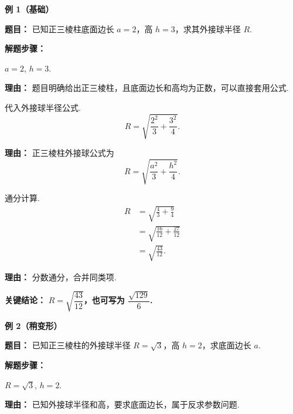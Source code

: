 \begin{examplebox}
	\textbf{\textcolor{CExample}{例 1（基础）}}

	\textbf{\textcolor{CExample}{题目：}} 已知正三棱柱底面边长 $a=2$，高 $h=3$，求其外接球半径 $R$.

	\textbf{\textcolor{CExample}{解题步骤：}}
	\begin{description}[style=nextline, leftmargin=2.8em, labelsep=0.5em, itemsep=0.45em]
		\item[\textbf{第一步（确认条件）：}] $a=2$, $h=3$.
		      \par\textbf{理由：} 题目明确给出正三棱柱，且底面边长和高均为正数，可以直接套用公式.

		\item[\textbf{第二步（套用公式）：}] 代入外接球半径公式.
		      \[
			      R = \sqrt{\frac{2^{2}}{3} + \frac{3^{2}}{4}}.
		      \]
		      \par\textbf{理由：} 正三棱柱外接球公式为
		      \[
			      R=\sqrt{\frac{a^{2}}{3}+\frac{h^{2}}{4}}.
		      \]

		\item[\textbf{第三步（计算化简）：}] 通分计算.
		      \[
			      \begin{aligned}
				      R
				       & = \sqrt{\frac{4}{3} + \frac{9}{4}}     \\
				       & = \sqrt{\frac{16}{12} + \frac{27}{12}} \\
				       & = \sqrt{\frac{43}{12}}.
			      \end{aligned}
		      \]
		      \par\textbf{理由：} 分数通分，合并同类项.
	\end{description}

	\textbf{\textcolor{CExample}{关键结论：}} \textbf{$R = \sqrt{\dfrac{43}{12}}$，也可写为 $\dfrac{\sqrt{129}}{6}$.}

	\medskip
	\textbf{\textcolor{CExample}{例 2（稍变形）}}

	\textbf{\textcolor{CExample}{题目：}} 已知正三棱柱的外接球半径 $R = \sqrt{3}$，高 $h=2$，求底面边长 $a$.

	\textbf{\textcolor{CExample}{解题步骤：}}
	\begin{description}[style=nextline, leftmargin=2.8em, labelsep=0.5em, itemsep=0.45em]
		\item[\textbf{第一步（确认条件）：}] $R = \sqrt{3}$, $h = 2$.
		      \par\textbf{理由：} 已知外接球半径和高，要求底面边长，属于反求参数问题.


\end{description}
\end{examplebox}
